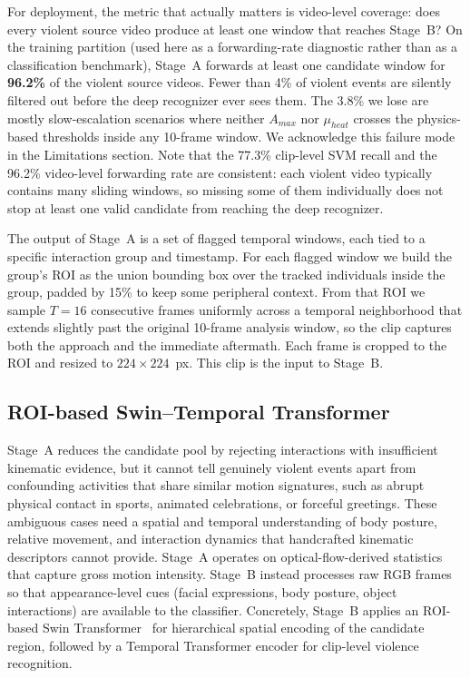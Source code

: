 \documentclass[conference]{IEEEtran}
\begin{document}
For deployment, the metric that actually matters is video-level coverage: does every violent source video produce at least one window that reaches Stage~B? On the training partition (used here as a forwarding-rate diagnostic rather than as a classification benchmark), Stage~A forwards at least one candidate window for \textbf{96.2\%} of the violent source videos. Fewer than 4\% of violent events are silently filtered out before the deep recognizer ever sees them. The 3.8\% we lose are mostly slow-escalation scenarios where neither $A_{max}$ nor $\mu_{heat}$ crosses the physics-based thresholds inside any 10-frame window. We acknowledge this failure mode in the Limitations section. Note that the 77.3\% clip-level SVM recall and the 96.2\% video-level forwarding rate are consistent: each violent video typically contains many sliding windows, so missing some of them individually does not stop at least one valid candidate from reaching the deep recognizer.

The output of Stage~A is a set of flagged temporal windows, each tied to a specific interaction group and timestamp. For each flagged window we build the group's ROI as the union bounding box over the tracked individuals inside the group, padded by 15\% to keep some peripheral context. From that ROI we sample $T = 16$ consecutive frames uniformly across a temporal neighborhood that extends slightly past the original 10-frame analysis window, so the clip captures both the approach and the immediate aftermath. Each frame is cropped to the ROI and resized to $224 \times 224$~px. This clip is the input to Stage~B.

\subsection{ROI-based Swin–Temporal Transformer}
Stage~A reduces the candidate pool by rejecting interactions with insufficient kinematic evidence, but it cannot tell genuinely violent events apart from confounding activities that share similar motion signatures, such as abrupt physical contact in sports, animated celebrations, or forceful greetings. These ambiguous cases need a spatial and temporal understanding of body posture, relative movement, and interaction dynamics that handcrafted kinematic descriptors cannot provide. Stage~A operates on optical-flow-derived statistics that capture gross motion intensity. Stage~B instead processes raw RGB frames so that appearance-level cues (facial expressions, body posture, object interactions) are available to the classifier. Concretely, Stage~B applies an ROI-based Swin Transformer~\cite{9710580} for hierarchical spatial encoding of the candidate region, followed by a Temporal Transformer encoder for clip-level violence recognition.
\end{document}
